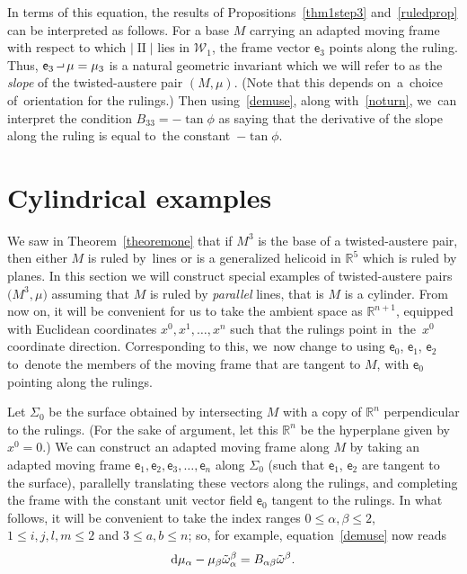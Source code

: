 \documentclass[pdftex]{sigma}
\def\R{\mathbb{R}}
\def\ve{\mathsf{e}}
\def\II{\operatorname{II}} %
\def\W{\mathscr{W}}
\def\wt{\tilde\omega}
\newcommand{\intprod}{\mathbin{\raisebox{.4ex}{\hbox{\vrule height .5pt width 5pt depth 0pt \vrule height 3pt width .5pt depth 0pt}}}}
\numberwithin{equation}{section}
\begin{document}
In terms of this equation, the results of Propositions~\ref{thm1step3} and~\ref{ruledprop} can be interpreted as follows. For a base $M$ carrying an adapted moving frame with respect to which $|\II|$ lies in $\W_1$, the frame vector $\ve_3$ points along the ruling. Thus, $\ve_3 \intprod \mu = \mu_3$ is a natural geometric invariant which we will refer to as the \emph{slope} of the twisted-austere pair $(M,\mu)$. (Note that this depends on~a~choice of~orientation for the rulings.) Then using~\eqref{demuse}, along with~\eqref{noturn}, we~can interpret the condition $B_{33}=-\tan\phi$ as saying that the derivative of the slope along the ruling is equal to~the constant~$-\tan\phi$.

\section{Cylindrical examples} \label{cylindersec}

We saw in Theorem~\ref{theoremone} that if $M^3$ is the base of a twisted-austere pair, then either $M$ is ruled by~lines or is a generalized helicoid in $\R^5$ which is ruled by planes. In this section we will construct special examples of twisted-austere pairs $\big(M^3, \mu\big)$ assuming that $M$ is ruled by \emph{parallel} lines, that is $M$ is a cylinder. From now on, it will be convenient for us to take the ambient space as $\R^{n+1}$, equipped with Euclidean coordinates $x^0, x^1, \dots, x^n$ such that the rulings point in~the~$x^0$ coordinate direction. Corresponding to this, we~now change to using $\ve_0$, $\ve_1$, $\ve_2$ to~denote the members of the moving frame that are tangent to $M$, with $\ve_0$ pointing along the rulings.

Let $\Sigma_0$ be the surface obtained by intersecting $M$ with a copy of $\R^{n}$ perpendicular to the rulings. (For the sake of argument, let this $\R^{n}$ be the hyperplane given by $x^0=0$.) We can construct an adapted moving frame along $M$ by taking an adapted moving frame $\ve_1, \ve_2, \ve_3, \dots, \ve_n$ along $\Sigma_0$ (such that $\ve_1$, $\ve_2$ are tangent to the surface), parallelly translating these vectors along the rulings, and completing the frame with the constant unit vector field $\ve_0$ tangent to the rulings. In what follows, it will be convenient to take the index ranges $0 \le \alpha,\beta \le 2$, $1 \le i,j,l,m \le 2$ and $3 \le a,b \le n$; so, for example, equation~\eqref{demuse} now reads
\begin{gather} \label{demusea}
{\rm d}\mu_\alpha - \mu_\beta\wt^\beta_\alpha = B_{\alpha\beta} \wt^\beta.
\end{gather}
\end{document}
